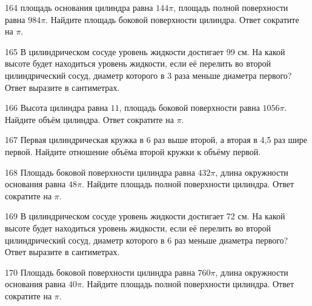 \documentclass[4apaper]{article}
\begin{document}
\begin{taskBN}{164}
площадь основания цилиндра равна $144\pi$, площадь полной поверхности равна $984\pi$. Найдите площадь боковой поверхности цилиндра. Ответ сократите на $\pi$.
\end{taskBN}

\begin{taskBN}{165}
В цилиндрическом сосуде уровень жидкости достигает 99 см. На какой высоте будет находиться уровень жидкости, если её перелить во второй цилиндрический сосуд, диаметр которого в 3 раза меньше диаметра первого? Ответ выразите в сантиметрах.
\end{taskBN}

\begin{taskBN}{166}
Высота цилиндра равна $11$, площадь боковой поверхности равна $1056\pi$. Найдите объём цилиндра. Ответ сократите на $\pi$.
\end{taskBN}

\begin{taskBN}{167}
 Первая цилиндрическая кружка в 6 раз выше второй, а вторая в 4,5 раз шире первой. Найдите отношение объёма второй кружки к объёму первой.
\end{taskBN}

\begin{taskBN}{168}
Площадь боковой поверхности цилиндра равна $432\pi$, длина окружности основания равна $48\pi$. Найдите площадь полной поверхности цилиндра. Ответ сократите на $\pi$.
\end{taskBN}

\begin{taskBN}{169}
В цилиндрическом сосуде уровень жидкости достигает 72 см. На какой высоте будет находиться уровень жидкости, если её перелить во второй цилиндрический сосуд, диаметр которого в 6 раз меньше диаметра первого? Ответ выразите в сантиметрах.
\end{taskBN}

\begin{taskBN}{170}
Площадь боковой поверхности цилиндра равна $760\pi$, длина окружности основания равна $40\pi$. Найдите площадь полной поверхности цилиндра. Ответ сократите на $\pi$.
\end{taskBN}
\end{document}
